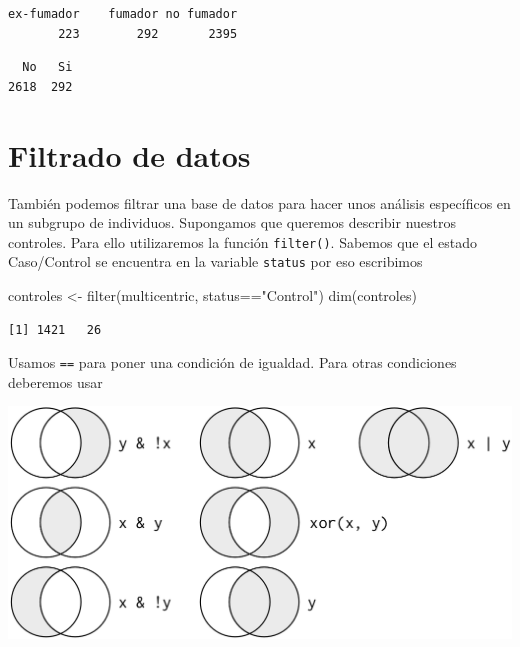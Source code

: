 \documentclass[
]{book}
\newenvironment{Shaded}{\begin{snugshade}}{\end{snugshade}}
\newcommand{\FunctionTok}[1]{\textcolor[rgb]{0.00,0.00,0.00}{#1}}
\newcommand{\NormalTok}[1]{#1}
\newcommand{\OtherTok}[1]{\textcolor[rgb]{0.56,0.35,0.01}{#1}}
\newcommand{\SpecialCharTok}[1]{\textcolor[rgb]{0.00,0.00,0.00}{#1}}
\newcommand{\StringTok}[1]{\textcolor[rgb]{0.31,0.60,0.02}{#1}}
\begin{document}
\begin{verbatim}
ex-fumador    fumador no fumador 
       223        292       2395 
\end{verbatim}

\begin{Shaded}
\end{Shaded}

\begin{verbatim}
  No   Si 
2618  292 
\end{verbatim}

\hypertarget{filtrado-de-datos}{%
\section{Filtrado de datos}\label{filtrado-de-datos}}

También podemos filtrar una base de datos para hacer unos análisis específicos en un subgrupo de individuos. Supongamos que queremos describir nuestros controles. Para ello utilizaremos la función \texttt{filter()}. Sabemos que el estado Caso/Control se encuentra en la variable \texttt{status} por eso escribimos

\begin{Shaded}
\begin{Highlighting}[]
\NormalTok{controles }\OtherTok{\textless{}{-}} \FunctionTok{filter}\NormalTok{(multicentric, status}\SpecialCharTok{==}\StringTok{"Control"}\NormalTok{)}
\FunctionTok{dim}\NormalTok{(controles)}
\end{Highlighting}
\end{Shaded}

\begin{verbatim}
[1] 1421   26
\end{verbatim}

Usamos \texttt{==} para poner una condición de igualdad. Para otras condiciones deberemos usar

\includegraphics{figures/transform-logical.png}
\end{document}

